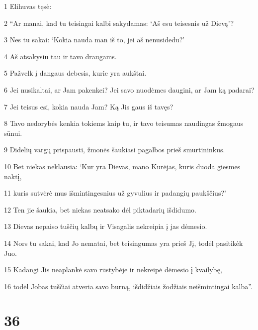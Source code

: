 \par 1 Elihuvas tęsė: 
\par 2 “Ar manai, kad tu teisingai kalbi sakydamas: ‘Aš esu teisesnis už Dievą’? 
\par 3 Nes tu sakai: ‘Kokia nauda man iš to, jei aš nenusidedu?’ 
\par 4 Aš atsakysiu tau ir tavo draugams. 
\par 5 Pažvelk į dangaus debesis, kurie yra aukštai. 
\par 6 Jei nusikaltai, ar Jam pakenkei? Jei savo nuodėmes daugini, ar Jam ką padarai? 
\par 7 Jei teisus esi, kokia nauda Jam? Ką Jis gaus iš tavęs? 
\par 8 Tavo nedorybės kenkia tokiems kaip tu, ir tavo teisumas naudingas žmogaus sūnui. 
\par 9 Didelių vargų prispausti, žmonės šaukiasi pagalbos prieš smurtininkus. 
\par 10 Bet niekas neklausia: ‘Kur yra Dievas, mano Kūrėjas, kuris duoda giesmes naktį, 
\par 11 kuris sutvėrė mus išmintingesnius už gyvulius ir padangių paukščius?’ 
\par 12 Ten jie šaukia, bet niekas neatsako dėl piktadarių išdidumo. 
\par 13 Dievas nepaiso tuščių kalbų ir Visagalis nekreipia į jas dėmesio. 
\par 14 Nors tu sakai, kad Jo nematai, bet teisingumas yra prieš Jį, todėl pasitikėk Juo. 
\par 15 Kadangi Jis neaplankė savo rūstybėje ir nekreipė dėmesio į kvailybę, 
\par 16 todėl Jobas tuščiai atveria savo burną, išdidžiais žodžiais neišmintingai kalba”.



\chapter{36}


